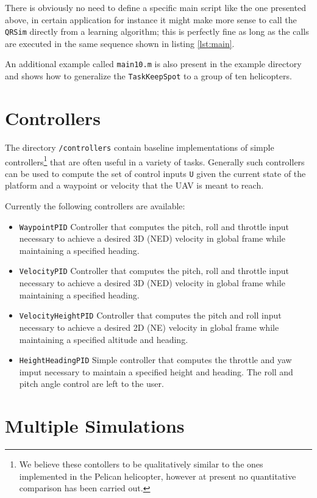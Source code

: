 \documentclass[a4paper,11pt]{report}
\newcommand{\snamettt}{\texttt{QRSim}\xspace}
\begin{document}
There is obviously no need to define a specific main script like the one presented above, in certain application for instance it might make more sense to call the \snamettt directly from  a learning algorithm; this is perfectly fine as long as the calls are executed in the same sequence shown in listing \ref{lst:main}.

An additional example called \texttt{main10.m} is also present in the example directory and shows how to generalize the \texttt{TaskKeepSpot} to a group of ten helicopters.

\section{Controllers}

The directory \texttt{/controllers} contain baseline implementations of simple controllers\footnote{We believe these contollers to be qualitatively similar to the ones implemented in the Pelican helicopter, however at present no quantitative comparison has been carried out.} that are often useful in a variety of tasks. Generally such controllers can be used to compute the set of control inputs \texttt{U} given the current state of the platform and a waypoint or velocity that the UAV is meant to reach. 

Currently the following controllers are available:
\begin{itemize}
\item \texttt{WaypointPID} Controller that computes the pitch, roll and throttle input necessary to achieve a desired 3D (NED) velocity in global frame while maintaining a specified heading.
\item \texttt{VelocityPID} Controller that computes the pitch, roll and throttle input necessary to achieve a desired 3D (NED) velocity in global frame while maintaining a specified heading.
\item \texttt{VelocityHeightPID} Controller that computes the pitch and roll input necessary to achieve a desired 2D (NE) velocity in global frame while maintaining a specified altitude and heading.
\item \texttt{HeightHeadingPID} Simple controller that computes the throttle and yaw imput necessary to maintain a specified height and heading. The roll and pitch angle control are left to the user.
\end{itemize}

\section{Multiple Simulations}
\end{document}
